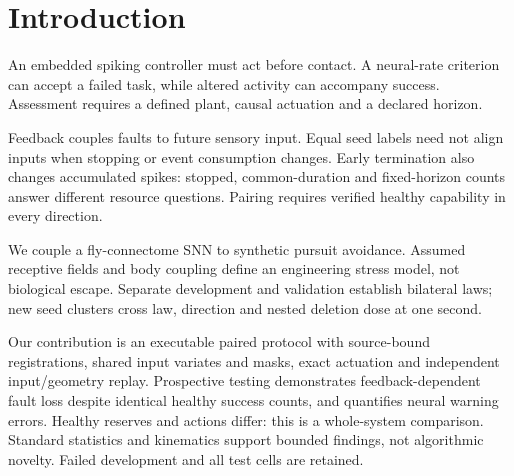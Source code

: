 \section{Introduction}
An embedded spiking controller must act before contact. A neural-rate criterion can accept a failed task, while altered activity can accompany success. Assessment requires a defined plant, causal actuation and a declared horizon.

Feedback couples faults to future sensory input. Equal seed labels need not align inputs when stopping or event consumption changes. Early termination also changes accumulated spikes: stopped, common-duration and fixed-horizon counts answer different resource questions. Pairing requires verified healthy capability in every direction.

We couple a fly-connectome SNN to synthetic pursuit avoidance. Assumed receptive fields and body coupling define an engineering stress model, not biological escape. Separate development and validation establish bilateral laws; new seed clusters cross law, direction and nested deletion dose at one second.

Our contribution is an executable paired protocol with source-bound registrations, shared input variates and masks, exact actuation and independent input/geometry replay. Prospective testing demonstrates feedback-dependent fault loss despite identical healthy success counts, and quantifies neural warning errors. Healthy reserves and actions differ: this is a whole-system comparison. Standard statistics and kinematics support bounded findings, not algorithmic novelty. Failed development and all test cells are retained.
